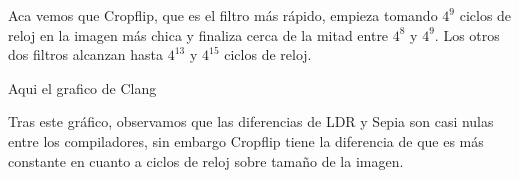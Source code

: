 Aca vemos que Cropflip, que es el filtro más rápido, empieza tomando $4^9$ ciclos de reloj en la imagen más chica y finaliza cerca de la mitad entre $4^8$ y $4^9$.
Los otros dos filtros alcanzan hasta $4^{13}$ y $4^{15}$ ciclos de reloj.

Aqui el grafico de Clang

\begin{figure}[H]
    \centering
    \begin{floatrow}
    \end{floatrow}
\end{figure}

Tras este gráfico, observamos que las diferencias de LDR y Sepia son casi nulas entre los compiladores, sin embargo Cropflip tiene la diferencia de que es más
constante en cuanto a ciclos de reloj sobre tamaño de la imagen.


